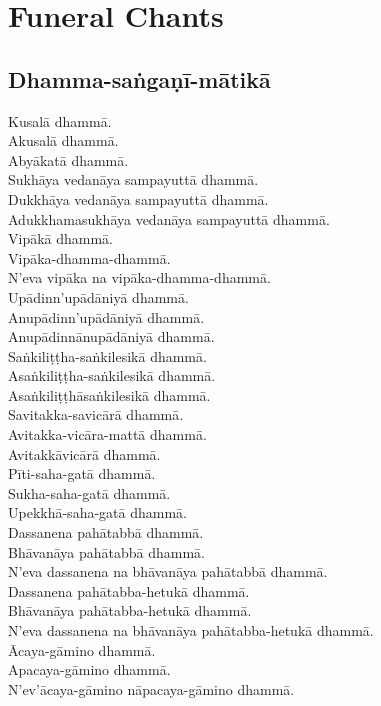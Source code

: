 \chapter{Funeral Chants}

\section{Dhamma-saṅgaṇī-mātikā}

Kusalā dhammā.\\
Akusalā dhammā.\\
Abyākatā dhammā.\\
Sukhāya vedanāya sampayuttā dhammā.\\
Dukkhāya vedanāya sampayuttā dhammā.\\
Adukkhamasukhāya vedanāya sampayuttā dhammā.\\
Vipākā dhammā.\\
Vipāka-dhamma-dhammā.\\
N'eva vipāka na vipāka-dhamma-dhammā.\\
Upādinn'upādāniyā dhammā.\\
Anupādinn'upādāniyā dhammā.\\
Anupādinnānupādāniyā dhammā.\\
Saṅkiliṭṭha-saṅkilesikā dhammā.\\
Asaṅkiliṭṭha-saṅkilesikā dhammā.\\
Asaṅkiliṭṭhāsaṅkilesikā dhammā.\\
Savitakka-savicārā dhammā.\\
Avitakka-vicāra-mattā dhammā.\\
Avitakkāvicārā dhammā.\\
Pīti-saha-gatā dhammā.\\
Sukha-saha-gatā dhammā.\\
Upekkhā-saha-gatā dhammā.\\
Dassanena pahātabbā dhammā.\\
Bhāvanāya pahātabbā dhammā.\\
N'eva dassanena na bhāvanāya pahātabbā dhammā.\\
Dassanena pahātabba-hetukā dhammā.\\
Bhāvanāya pahātabba-hetukā dhammā.\\
N'eva dassanena na bhāvanāya pahātabba-hetukā dhammā.\\
Ācaya-gāmino dhammā.\\
Apacaya-gāmino dhammā.\\
N'ev'ācaya-gāmino nāpacaya-gāmino dhammā.\\
